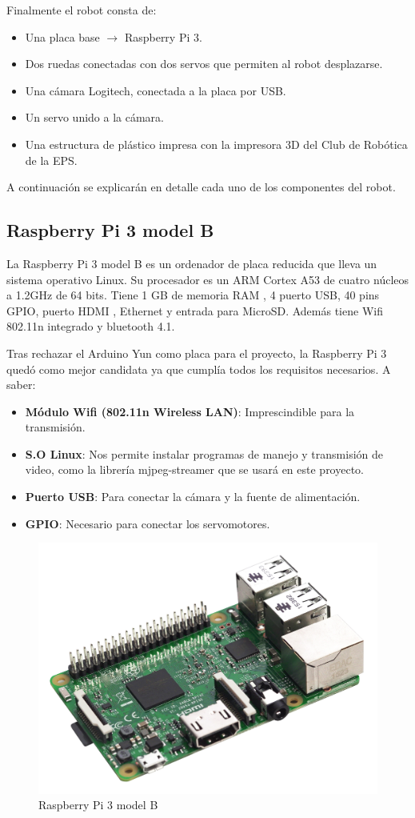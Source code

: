 \documentclass[twoside, 11pt]{epstfg}
\begin{document}
Finalmente el robot consta de:
\begin{itemize}
	\item Una placa base $\rightarrow$ Raspberry Pi 3.
	\item Dos ruedas conectadas con dos servos que permiten al robot desplazarse.
	\item Una cámara Logitech, conectada a la placa por USB.
	\item Un servo unido a la cámara.
	\item Una estructura de plástico impresa con la impresora 3D del Club de Robótica de la EPS.
\end{itemize}


A continuación se explicarán en detalle cada uno de los componentes del robot.

\subsection{Raspberry Pi 3 model B}
La Raspberry Pi 3 model B es un ordenador de placa reducida que lleva un sistema operativo Linux.
Su procesador es un ARM Cortex A53 de cuatro núcleos a 1.2GHz de 64 bits.
Tiene 1 GB de memoria RAM , 4 puerto USB, 40 pins GPIO, puerto HDMI , Ethernet y entrada para MicroSD.
Además tiene Wifi 802.11n integrado y bluetooth 4.1.

Tras rechazar el Arduino Yun como placa para el proyecto, la Raspberry Pi 3 quedó como mejor candidata ya que cumplía todos los requisitos necesarios. A saber:

\begin{itemize}
	\item \textbf{Módulo Wifi (802.11n Wireless LAN)}: Imprescindible para la transmisión.
	\item \textbf{S.O Linux}: Nos permite instalar programas de manejo y transmisión de video, como la librería mjpeg-streamer que se usará en este proyecto.
	\item \textbf{Puerto USB}: Para conectar la cámara y la fuente de alimentación.
	\item \textbf{GPIO}: Necesario para conectar los servomotores.
\end{itemize}


\begin{figure}[H]
	\centerline{
		\mbox{\includegraphics[width=.80\textwidth]{images/raspi3.jpg}}
	}
	\caption{Raspberry Pi 3 model B}
	\label{Raspberry}
	
\end{figure}
\end{document}
